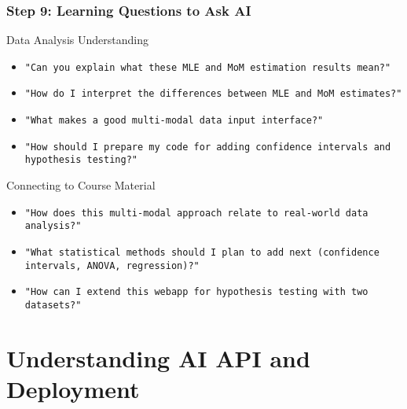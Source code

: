 \documentclass[aspectratio=169]{beamer}
\begin{document}
\begin{frame}
\frametitle{Step 9: Learning Questions to Ask AI}
\begin{exampleblock}{Data Analysis Understanding}
\begin{itemize}
\item \texttt{"Can you explain what these MLE and MoM estimation results mean?"}
\item \texttt{"How do I interpret the differences between MLE and MoM estimates?"}
\item \texttt{"What makes a good multi-modal data input interface?"}
\item \texttt{"How should I prepare my code for adding confidence intervals and hypothesis testing?"}
\end{itemize}
\end{exampleblock}

\begin{alertblock}{Connecting to Course Material}
\begin{itemize}
\item \texttt{"How does this multi-modal approach relate to real-world data analysis?"}
\item \texttt{"What statistical methods should I plan to add next (confidence intervals, ANOVA, regression)?"}
\item \texttt{"How can I extend this webapp for hypothesis testing with two datasets?"}
\end{itemize}
\end{alertblock}
\end{frame}

\section{Understanding AI API and Deployment}
\end{document}

